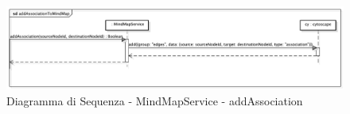 {}
\begin{center}
\begin{figure}[h]
\centering
\includegraphics[scale=0.33,keepaspectratio]{diagrammi/sequenza/FrontEnd/services/addAssociationToMindMap.pdf}
\caption{Diagramma di Sequenza - MindMapService - addAssociation}
\end{figure}
\end{center}
\FloatBarrier
%
